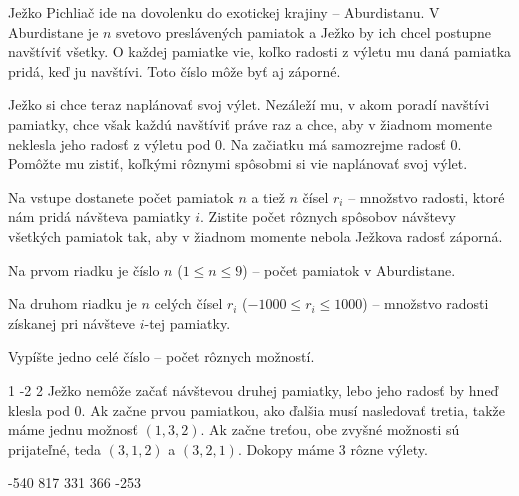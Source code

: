 





Ježko Pichliač ide na dovolenku do exotickej krajiny -- Aburdistanu. V Aburdistane je $n$ svetovo
preslávených pamiatok a Ježko by ich chcel postupne navštíviť všetky. O každej pamiatke vie, koľko
radosti z výletu mu daná pamiatka pridá, keď ju navštívi. Toto číslo môže byť aj záporné.

Ježko si chce teraz naplánovať svoj výlet. Nezáleží mu, v akom poradí navštívi pamiatky, chce však
každú navštíviť práve raz a chce, aby v žiadnom momente neklesla jeho radosť z výletu pod $0$. Na
začiatku má samozrejme radosť $0$. Pomôžte mu zistiť, koľkými rôznymi spôsobmi si vie naplánovať
svoj výlet.


Na vstupe dostanete počet pamiatok $n$ a tiež $n$ čísel $r_i$ -- množstvo radosti, ktoré nám pridá
návšteva pamiatky $i$. Zistite počet rôznych spôsobov návštevy všetkých pamiatok tak, aby v žiadnom
momente nebola Ježkova radosť záporná.


Na prvom riadku je číslo $n$ ($1 \leq n \leq 9$) -- počet pamiatok v Aburdistane.

Na druhom riadku je $n$ celých čísel $r_i$ ($-1000 \leq r_i \leq 1000$) -- množstvo radosti
získanej pri návšteve $i$-tej pamiatky.


Vypíšte jedno celé číslo -- počet rôznych možností.


1 -2 2
\komentar
Ježko nemôže začať návštevou druhej pamiatky, lebo jeho radosť by hneď klesla pod $0$. Ak začne
prvou pamiatkou, ako ďalšia musí nasledovať tretia, takže máme jednu možnosť $(1, 3, 2)$. Ak začne
treťou, obe zvyšné možnosti sú prijateľné, teda $(3, 1, 2)$ a $(3, 2, 1)$. Dokopy máme $3$ rôzne
výlety.
\koniec

-540 817 331 366 -253
\koniec



